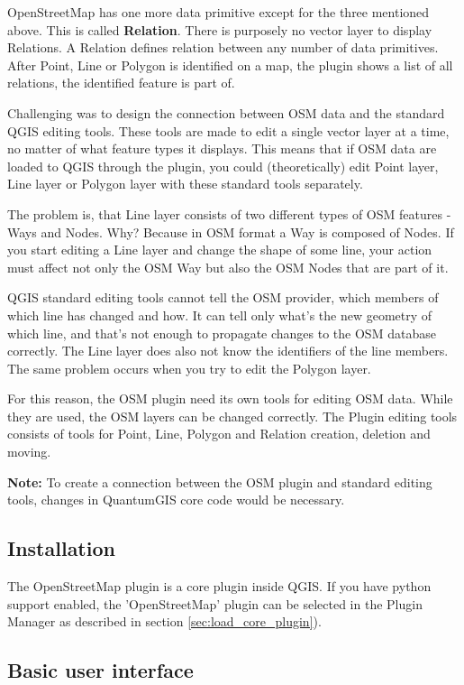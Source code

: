 OpenStreetMap has one more data primitive except for the three mentioned
above. This is called \textbf{Relation}. There is purposely no vector layer 
to display Relations. A Relation defines relation between any number of 
data primitives. After Point, Line or Polygon is identified on a map, 
the plugin shows a list of all relations, the identified feature is part of.

Challenging was to design the connection between OSM data and the 
standard QGIS editing tools. These tools are made to edit a single vector 
layer at a time, no matter of what feature types it displays. This means 
that if OSM data are loaded to QGIS through the plugin, you could 
(theoretically) edit Point layer, Line layer or Polygon layer with these 
standard tools separately.

The problem is, that Line layer consists of two different types of OSM
features - Ways and Nodes. Why? Because in OSM format a Way is composed of 
Nodes. If you start editing a Line layer and change the shape of some line, 
your action must affect not only the OSM Way but also the OSM Nodes that 
are part of it.

QGIS standard editing tools cannot tell the OSM provider, which members
of which line has changed and how. It can tell only what's the new geometry
of which line, and that's not enough to propagate changes to the OSM database
correctly. The Line layer does also not know the identifiers of the line 
members. The same problem occurs when you try to edit the Polygon layer.

For this reason, the OSM plugin need its own tools for editing OSM data. 
While they are used, the OSM layers can be changed correctly. The Plugin 
editing tools consists of tools for Point, Line, Polygon and 
Relation creation, deletion and moving.

\textbf{Note:} To create a connection between the OSM plugin and standard 
editing tools, changes in QuantumGIS core code would be necessary.

\subsection{Installation}

The OpenStreetMap plugin is a core plugin inside QGIS. If you have python 
support enabled, the 'OpenStreetMap' plugin can be selected in the Plugin 
Manager as described in section \ref{sec:load_core_plugin}). 

\subsection{Basic user interface}

